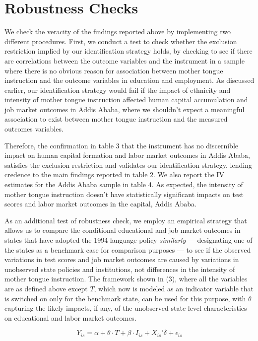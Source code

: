 
\section{Robustness Checks}

We check the veracity of the findings reported above by implementing two different procedures. First, we conduct a test to check whether the exclusion restriction implied by our identification strategy holds, by checking to see if there are correlations between the outcome variables and the instrument in a sample where there is no obvious reason for association between mother tongue instruction and the outcome variables in education and employment. As discussed earlier, our identification strategy would fail if the impact of ethnicity and intensity of mother tongue instruction affected human capital accumulation and job market outcomes in Addis Ababa, where we shouldn’t expect a meaningful association to exist between mother tongue instruction and the measured outcomes variables. 

Therefore, the confirmation in table 3 that the instrument has no discernible impact on human capital formation and labor market outcomes in Addis Ababa, satisfies the exclusion restriction and validates our identification strategy, lending credence to the main findings reported in table 2. We also report the IV estimates for the Addis Ababa sample in table 4. As expected, the intensity of mother tongue instruction doesn’t have statistically significant impacts on test scores and labor market outcomes in the capital, Addis Ababa.

As an additional test of robustness check, we employ an empirical strategy that allows us to compare the conditional educational and job market outcomes in states that have adopted the 1994 language policy \textit{similarly} --- designating one of the states as a benchmark case for comparison purposes --- to see if the observed variations in test scores and job market outcomes are caused by variations in unobserved state policies and institutions, not differences in the intensity of mother tongue instruction. The framework shown in (3), where all the variables are as defined above except $ T $, which now is modeled as an indicator variable that is switched on only for the benchmark state, can be used for this purpose, with $ \theta $ capturing the likely impacts, if any, of the unobserved state-level characteristics on educational and labor market outcomes. 

\begin{equation}
	Y_{is} = \alpha + \theta\cdot T + \beta\cdot I_{is} + X_{is}'\delta + \epsilon_{is}
\end{equation}

